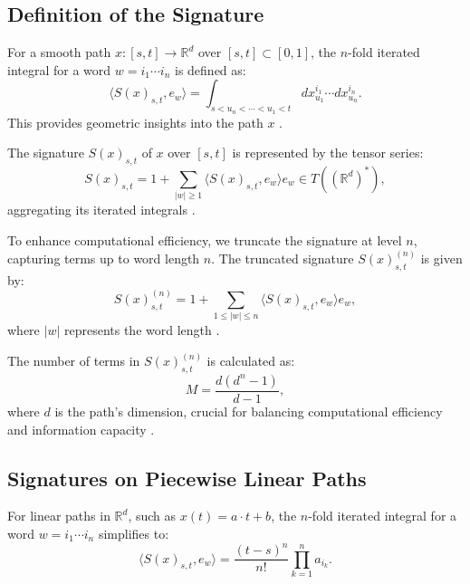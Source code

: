 \subsection{Definition of the Signature}
\label{subsec:signature-definition}

For a smooth path \(x : [s, t] \to \mathbb{R}^d\) over \( [s, t] \subset [0, 1]\), the \(n\)-fold iterated integral for a word \(w = i_1 \cdots i_n\) is defined as:
\begin{equation}
\langle S(x)_{s,t}, e_w \rangle = \int_{s < u_n < \cdots < u_1 < t} dx_{u_1}^{i_1} \cdots dx_{u_n}^{i_n}.
\end{equation}
This provides geometric insights into the path \(x\) \cite{lyonsRoughPathsSignatures2014}.

The signature \(S(x)_{s,t}\) of \(x\) over \( [s, t] \) is represented by the tensor series:
\begin{equation}
S(x)_{s,t} = 1 + \sum_{|w| \geq 1} \langle S(x)_{s,t}, e_w \rangle e_w \in T((\mathbb{R}^d)^*),
\end{equation}
aggregating its iterated integrals \cite{lyonsRadiusConvergenceLogarithmic2006}.

To enhance computational efficiency, we truncate the signature at level \( n \), capturing terms up to word length \( n \). The truncated signature \( S(x)_{s,t}^{(n)} \) is given by:
\begin{equation}
S(x)_{s,t}^{(n)} = 1 + \sum_{1 \leq |w| \leq n} \langle S(x)_{s,t}, e_w \rangle e_w,
\end{equation}
where \( |w| \) represents the word length \cite{reizensteinCalculationIteratedIntegralSignatures2017}.

The number of terms in \( S(x)_{s,t}^{(n)} \) is calculated as:
\begin{equation}
M = \frac{d(d^n - 1)}{d - 1},
\label{eq:logsig-terms}
\end{equation}
where \(d\) is the path's dimension, crucial for balancing computational efficiency and information capacity \cite{reizensteinIisignatureLibraryEfficient2018}.


\subsection{Signatures on Piecewise Linear Paths}
\label{subsec:signature-piecewise-linear}

For linear paths in \(\mathbb{R}^d\), such as \(x(t) = a \cdot t + b\), the \(n\)-fold iterated integral for a word \(w = i_1 \cdots i_n\) simplifies to:
\begin{equation}
\langle S(x)_{s,t}, e_w \rangle = \frac{(t - s)^n}{n!} \prod_{k=1}^n a_{i_k}.
\end{equation}


